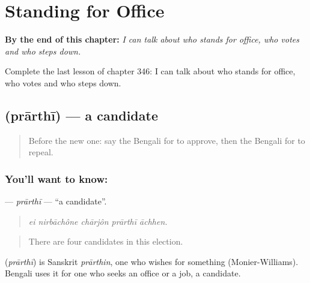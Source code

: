 
\chapter{Standing for Office}
\label{ch:bn-standing-for-office}

\begin{chapteropening}
\textbf{By the end of this chapter:} \emph{I can talk about who stands for office, who votes and who steps down.}

Complete the last lesson of chapter 346: I can talk about who stands for office, who votes and who steps down.
\end{chapteropening}

\section[\texorpdfstring{\bn{প্রার্থী} (prārthī)}{প্রার্থী (prārthī)}]{ (prārthī) — a candidate}

\label{lesson:BN-C346-prarthi}



\begin{quote}
Before the new one: say the Bengali for to approve, then the Bengali for to repeal.
\end{quote}

\subsection*{You'll want to know: }
\textbf{} — \emph{prārthī} — \textquotedblleft{}a candidate\textquotedblright{}.

\begin{quote}
    
\end{quote}

\begin{quote}
\emph{ei nirbāchône chārjôn prārthī āchhen.}
\end{quote}

\begin{quote}
There are four candidates in this election.
\end{quote}

\begin{cousinweb}
\textbf{} (\emph{prārthī}) is Sanskrit \emph{prārthin}, one who wishes for something (Monier-Williams). Bengali uses it for one who seeks an office or a job, a candidate.
\end{cousinweb}

